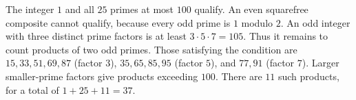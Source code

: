 The integer $1$ and all $25$ primes at most $100$ qualify. An even squarefree composite cannot qualify, because every odd prime is $1$ modulo $2$. An odd integer with three distinct prime factors is at least $3\cdot5\cdot7=105$. Thus it remains to count products of two odd primes. Those satisfying the condition are $15,33,51,69,87$ (factor $3$), $35,65,85,95$ (factor $5$), and $77,91$ (factor $7$). Larger smaller-prime factors give products exceeding $100$. There are $11$ such products, for a total of $1+25+11=\boxed{37}$.
